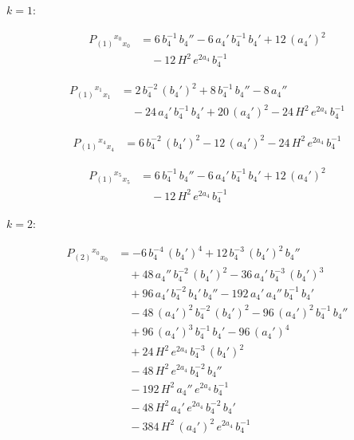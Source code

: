 \documentclass[11pt]{article}
\begin{document}
$k = 1$:

\[
\begin{aligned}
P_{(1)}{}^{x_0}{}_{x_0} &= 6\,b_4^{-1}\,b_4'' - 6\,a_4'\,b_4^{-1}\,b_4' + 12\,(a_4')^{2} \\
&\quad - 12\,H^{2}\,e^{2 a_4}\,b_4^{-1}
\end{aligned}
\]

\[
\begin{aligned}
P_{(1)}{}^{x_1}{}_{x_1} &= 2\,b_4^{-2}\,(b_4')^{2} + 8\,b_4^{-1}\,b_4'' - 8\,a_4'' \\
&\quad - 24\,a_4'\,b_4^{-1}\,b_4' + 20\,(a_4')^{2} - 24\,H^{2}\,e^{2 a_4}\,b_4^{-1}
\end{aligned}
\]

\[
\begin{aligned}
P_{(1)}{}^{x_4}{}_{x_4} &= 6\,b_4^{-2}\,(b_4')^{2} - 12\,(a_4')^{2} - 24\,H^{2}\,e^{2 a_4}\,b_4^{-1}
\end{aligned}
\]

\[
\begin{aligned}
P_{(1)}{}^{x_5}{}_{x_5} &= 6\,b_4^{-1}\,b_4'' - 6\,a_4'\,b_4^{-1}\,b_4' + 12\,(a_4')^{2} \\
&\quad - 12\,H^{2}\,e^{2 a_4}\,b_4^{-1}
\end{aligned}
\]

$k = 2$:

\[
\begin{aligned}
P_{(2)}{}^{x_0}{}_{x_0} &= -6\,b_4^{-4}\,(b_4')^{4} + 12\,b_4^{-3}\,(b_4')^{2}\,b_4'' \\
&\quad + 48\,a_4''\,b_4^{-2}\,(b_4')^{2} - 36\,a_4'\,b_4^{-3}\,(b_4')^{3} \\
&\quad + 96\,a_4'\,b_4^{-2}\,b_4'\,b_4'' - 192\,a_4'\,a_4''\,b_4^{-1}\,b_4' \\
&\quad - 48\,(a_4')^{2}\,b_4^{-2}\,(b_4')^{2} - 96\,(a_4')^{2}\,b_4^{-1}\,b_4'' \\
&\quad + 96\,(a_4')^{3}\,b_4^{-1}\,b_4' - 96\,(a_4')^{4} \\
&\quad + 24\,H^{2}\,e^{2 a_4}\,b_4^{-3}\,(b_4')^{2} \\
&\quad - 48\,H^{2}\,e^{2 a_4}\,b_4^{-2}\,b_4'' \\
&\quad - 192\,H^{2}\,a_4''\,e^{2 a_4}\,b_4^{-1} \\
&\quad - 48\,H^{2}\,a_4'\,e^{2 a_4}\,b_4^{-2}\,b_4' \\
&\quad - 384\,H^{2}\,(a_4')^{2}\,e^{2 a_4}\,b_4^{-1}
\end{aligned}
\]
\end{document}
